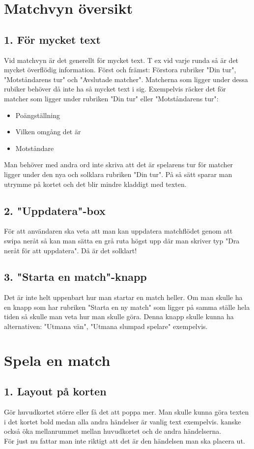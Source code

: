 \documentclass[11pt,a4paper]{article}
\author{FipparN}
\begin{document}
\section{Matchvyn översikt}
\subsection{1. För mycket text}
Vid matchvyn är det generellt för mycket text. T ex vid varje runda så är det mycket överflödig information. 
Först och främst: Förstora rubriker "Din tur", "Motståndarens tur" och "Avslutade matcher". Matcherna som ligger under dessa rubiker behöver då inte ha så mycket text i sig. Exempelvis räcker det för matcher som ligger under rubriken "Din tur" eller "Motståndarens tur":
\begin{itemize}
\item Poängställning
\item Vilken omgång det är
\item Motståndare
\end{itemize}
Man behöver med andra ord inte skriva att det är spelarens tur för matcher ligger under den nya och solklara rubriken "Din tur". På så sätt sparar man utrymme på kortet och det blir mindre kladdigt med texten.\\

\subsection{2. "Uppdatera"-box}
För att användaren ska veta att man kan uppdatera matchflödet genom att swipa neråt så kan man sätta en grå ruta högst upp där man skriver typ "Dra neråt för att uppdatera". Då är det solklart!

\subsection{3. "Starta en match"-knapp}
Det är inte helt uppenbart hur man startar en match heller. Om man skulle ha en knapp som har rubriken "Starta en ny match" som ligger på samma ställe hela tiden så skulle man veta hur man skulle göra. Denna knapp skulle kunna ha alternativen: "Utmana vän", "Utmana slumpad spelare" exempelvis.

\section{Spela en match}
\subsection{1. Layout på korten}
Gör huvudkortet större eller få det att poppa mer. Man skulle kunna göra texten i det kortet bold medan alla andra händelser är vanlig text exempelvis. kanske också öka mellanrummet mellan huvudkortet och de andra händelserna.\\
För just nu fattar man inte riktigt att det är den händelsen man ska placera ut.
\end{document}
